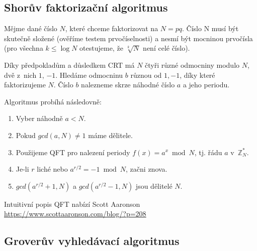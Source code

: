 \subsection{Shorův faktorizační algoritmus}

Mějme dané číslo $N$, které chceme faktorizovat na $N = pq$.
Číslo N musí být skutečně složené (ověříme testem prvočíselnosti)
a nesmí být mocninou prvočísla (pro všechna $k \leq \log N$ otestujeme,
že $\sqrt[k]{N}$ není celé číslo).

Díky předpokladům a důsledkem CRT má $N$ čtyři různé odmocniny modulo
$N$, dvě z~nich $1$, $-1$. Hledáme odmocninu $b$ různou od $1,-1$, díky
které faktorizujeme $N$. Číslo $b$ nalezneme skrze náhodné číslo $a$
a jeho periodu.

Algoritmus probíhá následovně:

\begin{enumerate}
    \item Vyber náhodně $a < N$.
    \item Pokud $gcd(a, N) \neq 1$ máme dělitele.
    \item Použijeme QFT pro nalezení periody $f(x) = a^x \bmod N$,
        tj. řádu $a$ v~$\mathbb{Z}_N^*$.
    \item Je-li $r$ liché nebo $a^{r/2} = -1 \bmod N$, začni znova.
    \item $gcd(a^{r/2} + 1, N)$ a $gcd(a^{r/2} - 1, N)$ jsou dělitelé $N$.
\end{enumerate}

Intuitivní popis QFT nabízí Scott Aaronson \\
\href{https://www.scottaaronson.com/blog/?p=208}{https://www.scottaaronson.com/blog/?p=208}


\subsection{Groverův vyhledávací algoritmus}




